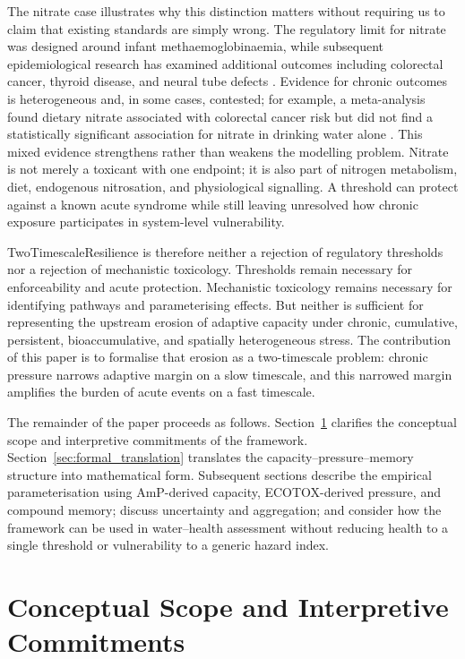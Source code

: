 The nitrate case illustrates why this distinction matters without requiring us to claim that existing standards are simply wrong. The regulatory limit for nitrate was designed around infant methaemoglobinaemia, while subsequent epidemiological research has examined additional outcomes including colorectal cancer, thyroid disease, and neural tube defects \citep{ward2018nitrate}. Evidence for chronic outcomes is heterogeneous and, in some cases, contested; for example, a meta-analysis found dietary nitrate associated with colorectal cancer risk but did not find a statistically significant association for nitrate in drinking water alone \citep{hosseini2021nitrate}. This mixed evidence strengthens rather than weakens the modelling problem. Nitrate is not merely a toxicant with one endpoint; it is also part of nitrogen metabolism, diet, endogenous nitrosation, and physiological signalling. A threshold can protect against a known acute syndrome while still leaving unresolved how chronic exposure participates in system-level vulnerability.

TwoTimescaleResilience is therefore neither a rejection of regulatory thresholds nor a rejection of mechanistic toxicology. Thresholds remain necessary for enforceability and acute protection. Mechanistic toxicology remains necessary for identifying pathways and parameterising effects. But neither is sufficient for representing the upstream erosion of adaptive capacity under chronic, cumulative, persistent, bioaccumulative, and spatially heterogeneous stress. The contribution of this paper is to formalise that erosion as a two-timescale problem: chronic pressure narrows adaptive margin on a slow timescale, and this narrowed margin amplifies the burden of acute events on a fast timescale.

The remainder of the paper proceeds as follows. Section~\ref{sec:conceptual_scope} clarifies the conceptual scope and interpretive commitments of the framework. Section~\ref{sec:formal_translation} translates the capacity--pressure--memory structure into mathematical form. Subsequent sections describe the empirical parameterisation using AmP-derived capacity, ECOTOX-derived pressure, and compound memory; discuss uncertainty and aggregation; and consider how the framework can be used in water--health assessment without reducing health to a single threshold or vulnerability to a generic hazard index.

\section{Conceptual Scope and Interpretive Commitments}
\label{sec:conceptual_scope}


